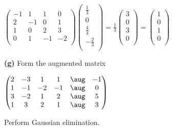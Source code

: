 \documentclass[oneside,12pt]{amsart}
\begin{document}
$
\begin{pmatrix}
 -1  &  1 &  1 &  0 \\
  2  & -1 &  0 &  1 \\
  1  &  0 &  2 &  3 \\
  0  &  1 & -1 & -2 \\
\end{pmatrix}
\begin{pmatrix}
\frac{1}{3}  \\[6pt]
0            \\[6pt]
\frac{4}{3}  \\[6pt]
-\frac{2}{3} \\[6pt]
\end{pmatrix}
=
\frac{1}{3}
\begin{pmatrix}
3 \\
0 \\
3 \\
0 \\
\end{pmatrix}
=
\begin{pmatrix}
1 \\
0 \\
1 \\
0 \\
\end{pmatrix}
$


\textbf{(g)} Form the augmented matrix

\bigskip

$
\begin{pmatrix}
  2  & -3 &  1 &  1 & \aug & -1  \\
  1  & -1 & -2 & -1 & \aug &  0  \\
  3  & -2 &  1 &  2 & \aug &  5  \\
  1  &  3 &  2 &  1 & \aug &  3  \\
\end{pmatrix}
$
\bigskip

Perform Gaussian elimination.

\bigskip
\end{document}
